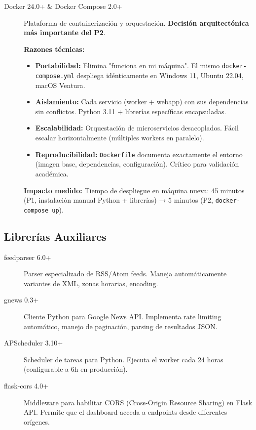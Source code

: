 \begin{description}
    \item[Docker 24.0+ \& Docker Compose 2.0+] 
    Plataforma de containerización y orquestación. \textbf{Decisión arquitectónica más importante del P2}.
    
    \textbf{Razones técnicas:}
    \begin{itemize}
        \item \textbf{Portabilidad:} Elimina "funciona en mi máquina". El mismo \texttt{docker-compose.yml} despliega idénticamente en Windows 11, Ubuntu 22.04, macOS Ventura.
        \item \textbf{Aislamiento:} Cada servicio (worker + webapp) con sus dependencias sin conflictos. Python 3.11 + librerías específicas encapsuladas.
        \item \textbf{Escalabilidad:} Orquestación de microservicios desacoplados. Fácil escalar horizontalmente (múltiples workers en paralelo).
        \item \textbf{Reproducibilidad:} \texttt{Dockerfile} documenta exactamente el entorno (imagen base, dependencias, configuración). Crítico para validación académica.
    \end{itemize}
    
    \textbf{Impacto medido:} Tiempo de despliegue en máquina nueva: 45 minutos (P1, instalación manual Python + librerías) → 5 minutos (P2, \texttt{docker-compose up}).
\end{description}

\subsection{Librerías Auxiliares}

\begin{description}
    \item[feedparser 6.0+] Parser especializado de RSS/Atom feeds. Maneja automáticamente variantes de XML, zonas horarias, encoding.
    
    \item[gnews 0.3+] Cliente Python para Google News API. Implementa rate limiting automático, manejo de paginación, parsing de resultados JSON.
    
    \item[APScheduler 3.10+] Scheduler de tareas para Python. Ejecuta el worker cada 24 horas (configurable a 6h en producción).
    
    \item[flask-cors 4.0+] Middleware para habilitar CORS (Cross-Origin Resource Sharing) en Flask API. Permite que el dashboard acceda a endpoints desde diferentes orígenes.
\end{description}

